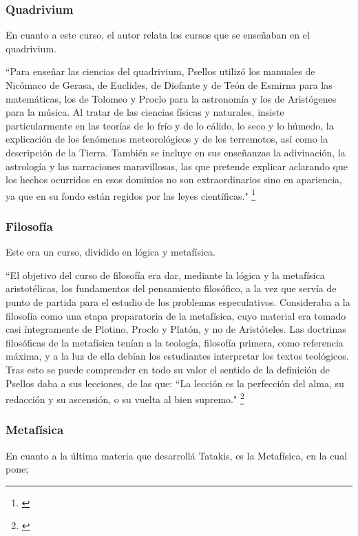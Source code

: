 \subsubsection{Quadrivium}
En cuanto a este curso, el autor relata los cursos 
que se enseñaban en el quadrivium.

“Para enseñar las ciencias del quadrivium, Psellos utilizó los 
manuales de Nicómaco de Gerasa, de Euclides, de Diofante y de 
Teón de Esmirna para las matemáticas, los de Tolomeo y Proclo para la 
astronomía y los de Aristógenes para la música. 
Al tratar de las ciencias físicas y naturales, insiste particularmente 
en las teorías de lo frío y de lo cálido, lo seco y lo húmedo, 
la explicación de los fenómenos meteorológicos y de los terremotos, 
así como la descripción de la Tierra. 
También se incluye en sus enseñanzas la adivinación, 
la astrología y las narraciones maravillosas, 
las que pretende explicar aclarando que los hechos ocurridos en esos 
dominios no son extraordinarios sino en apariencia, 
ya que en su fondo están regidos por las leyes científicas."
\footnote{\cite[p.~163]{filosofia}}

\subsubsection{Filosofía}
Este era un curso, dividido en lógica y metafísica.

“El objetivo del curso de filosofía era dar, mediante la lógica y 
la metafísica aristotélicas, los fundamentos del pensamiento 
filosófico, a la vez que servía de punto de partida para el 
estudio de los problemas especulativos. Consideraba a la filosofía 
como una etapa preparatoria de la metafísica, cuyo material era tomado 
casi íntegramente de Plotino, Proclo y Platón, y no de Aristóteles. 
Las doctrinas filosóficas de la metafísica tenían a la teología, 
filosofía primera, como referencia máxima, y a la luz de ella debían 
los estudiantes interpretar los textos teológicos. 
Tras esto se puede comprender en todo su valor el sentido de la 
definición de Psellos daba a sus lecciones, de las que: 
“La lección es la perfección del alma, su redacción y su ascensión, 
o su vuelta al bien supremo."
\footnote{\cite[pp.~164--165]{filosofia}}

\subsubsection{Metafísica}
En cuanto a la última materia que desarrollá Tatakis, 
es la Metafísica, en la cual pone;

